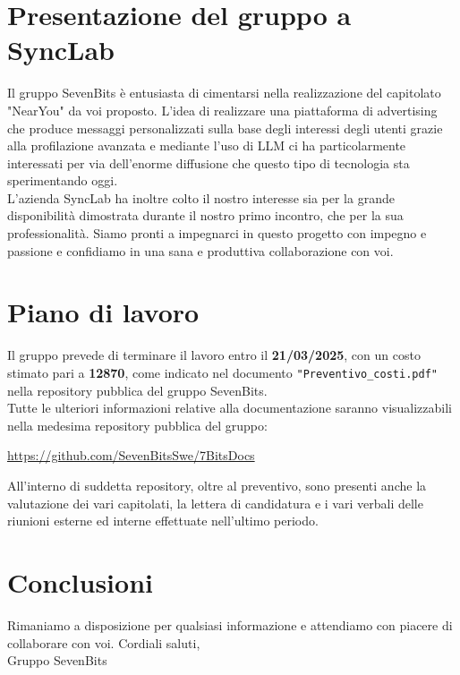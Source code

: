 \documentclass[10pt]{article}
\begin{document}
\newpage
\section{Presentazione del gruppo a SyncLab}
Il gruppo SevenBits è entusiasta di cimentarsi nella realizzazione del capitolato "NearYou" da voi proposto. L'idea di realizzare una piattaforma di advertising
che produce messaggi personalizzati sulla base degli interessi degli utenti grazie alla profilazione avanzata e mediante l'uso di LLM ci ha particolarmente
interessati per via dell'enorme diffusione che questo tipo di tecnologia sta sperimentando oggi. \\
L'azienda SyncLab ha inoltre colto il nostro interesse sia per la grande disponibilità dimostrata durante il nostro primo incontro, che per la sua professionalità.
Siamo pronti a impegnarci in questo progetto con impegno e passione e confidiamo in una sana e produttiva collaborazione con voi.
\section{Piano di lavoro}
Il gruppo prevede di terminare il lavoro entro il \textbf{21/03/2025}, con un costo stimato pari a \textbf{12870\texteuro}, come indicato nel documento 
\texttt{"Preventivo\_costi.pdf"} nella repository pubblica del gruppo SevenBits.\\
Tutte le ulteriori informazioni relative alla documentazione saranno visualizzabili nella medesima repository pubblica del gruppo:\\
\begin{center}
\url{https://github.com/SevenBitsSwe/7BitsDocs}\\    
\end{center}
\vspace{2mm}
All'interno di suddetta repository, oltre al preventivo, sono presenti anche la valutazione dei vari capitolati, la lettera di candidatura e i vari verbali delle 
riunioni esterne ed interne effettuate nell'ultimo periodo.


\section{Conclusioni}
Rimaniamo a disposizione per qualsiasi informazione e attendiamo con piacere di collaborare con voi.
\vspace{2mm}
\newline
Cordiali saluti,\\
Gruppo SevenBits
\end{document}
